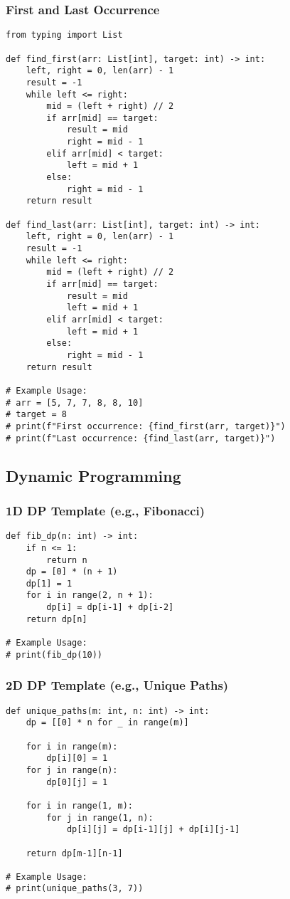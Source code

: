 \documentclass[11pt, a4paper]{article}
\begin{document}
\subsubsection{First and Last Occurrence}
\begin{verbatim}
from typing import List

def find_first(arr: List[int], target: int) -> int:
    left, right = 0, len(arr) - 1
    result = -1
    while left <= right:
        mid = (left + right) // 2
        if arr[mid] == target:
            result = mid
            right = mid - 1
        elif arr[mid] < target:
            left = mid + 1
        else:
            right = mid - 1
    return result

def find_last(arr: List[int], target: int) -> int:
    left, right = 0, len(arr) - 1
    result = -1
    while left <= right:
        mid = (left + right) // 2
        if arr[mid] == target:
            result = mid
            left = mid + 1
        elif arr[mid] < target:
            left = mid + 1
        else:
            right = mid - 1
    return result

# Example Usage:
# arr = [5, 7, 7, 8, 8, 10]
# target = 8
# print(f"First occurrence: {find_first(arr, target)}")
# print(f"Last occurrence: {find_last(arr, target)}")
\end{verbatim}

\subsection{Dynamic Programming}
\subsubsection{1D DP Template (e.g., Fibonacci)}
\begin{verbatim}
def fib_dp(n: int) -> int:
    if n <= 1:
        return n
    dp = [0] * (n + 1)
    dp[1] = 1
    for i in range(2, n + 1):
        dp[i] = dp[i-1] + dp[i-2]
    return dp[n]

# Example Usage:
# print(fib_dp(10))
\end{verbatim}

\subsubsection{2D DP Template (e.g., Unique Paths)}
\begin{verbatim}
def unique_paths(m: int, n: int) -> int:
    dp = [[0] * n for _ in range(m)]
    
    for i in range(m):
        dp[i][0] = 1
    for j in range(n):
        dp[0][j] = 1
        
    for i in range(1, m):
        for j in range(1, n):
            dp[i][j] = dp[i-1][j] + dp[i][j-1]
            
    return dp[m-1][n-1]

# Example Usage:
# print(unique_paths(3, 7))
\end{verbatim}
\end{document}
